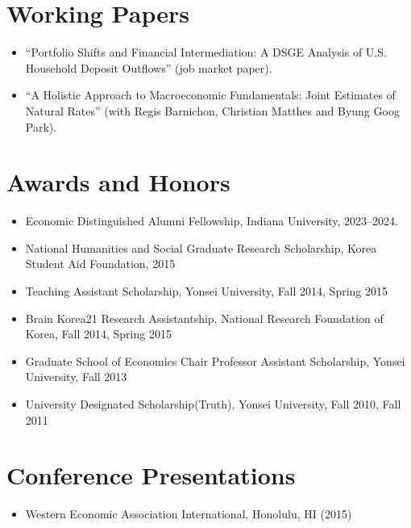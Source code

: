 \documentclass[11pt,a4paper]{article}
\begin{document}
\vspace{5mm}

\section*{Working Papers} 
\begin{itemize}[leftmargin=*]
    \item ``Portfolio Shifts and Financial Intermediation: A DSGE Analysis of U.S. Household Deposit Outflows'' (job market paper).
    \item ``A Holistic Approach to Macroeconomic
        Fundamentals: Joint Estimates of
        Natural Rates'' (with Regis Barnichon, Christian Matthes and Byung Goog Park).    
\end{itemize}
\vspace{5mm}
\section*{Awards and Honors}
\begin{itemize}[leftmargin=*]   
\item Economic Distinguished Alumni Fellowship, Indiana University, 2023--2024.    
\item National Humanities and Social Graduate Research Scholarship, Korea Student Aid Foundation, 2015
\item Teaching Assistant Scholarship, Yonsei University, Fall 2014, Spring 2015
\item Brain Korea21 Research Assistantship, National Research Foundation of Korea, Fall 2014, Spring 2015
\item Graduate School of Economics Chair Professor Assistant Scholarship, Yonsei University, Fall 2013
\item University Designated Scholarship(Truth), Yonsei University, Fall 2010, Fall 2011
\end{itemize}
\vspace{5mm}
\section*{Conference Presentations}
\begin{itemize}[leftmargin=*]
    \item Western Economic Association International, Honolulu, HI (2015)    
\end{itemize}
\vspace{5mm}
\end{document}
